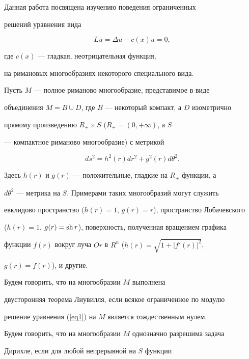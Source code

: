 Данная работа посвящена изучению поведения  ограниченных


решений уравнения вида


\begin{equation}


Lu=\Delta u-c(x)u=0,


\label{eq1}


\end{equation}


где $c(x)$ --- гладкая, неотрицательная функция,


на римановых многообразиях некоторого специального вида.





Пусть $M$ --- полное риманово многообразие, представимое в виде


объединения $M=B\cup D$, где $B$ --- некоторый компакт, а $D$ изометрично


прямому произведению $R_+\times S$ ($R_+=(0,+\infty)$, а $S$


--- компактное риманово многообразие) с метрикой


$$


ds^2=h^2(r)dr^2+g^2(r)d\theta^2.


$$


Здесь $h(r)$ и $g(r)$ --- положительные, гладкие на $R_+$ функции, а


$d\theta^2$ --- метрика на $S$. Примерами таких многообразий могут служить


евклидово пространство ($h(r)=1$, $g(r)=r$), пространство Лобачевского


($h(r)=1$, $g(r)=\operatorname{sh}{r}$), поверхность, полученная вращением графика


функции $f(r)$ вокруг луча $Or$ в $R^n$ ($h(r)=\sqrt{1+|f'(r)|^2}$,


$g(r)=f(r)$), и другие.





Будем говорить, что на многообразии $M$ выполнена


двусторонняя теорема Лиувилля, если всякое ограниченное по модулю


решение уравнения (\ref{eq1}) на $M$ является тождественным нулем.





Будем говорить, что на многообразии $M$ однозначно разрешима задача


Дирихле, если для любой непрерывной на $S$ функции


